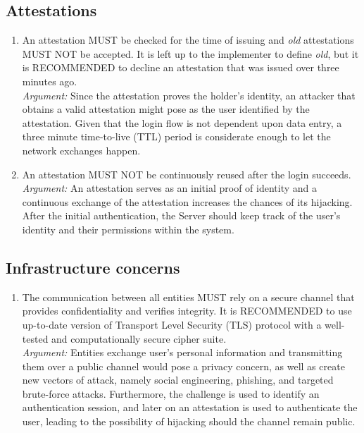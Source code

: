     \subsection{Attestations}
        \begin{enumerate}[resume]
            \item An attestation MUST be checked for the time of issuing and \textit{old} attestations MUST NOT be
                  accepted. It is left up to the implementer to define \textit{old}, but it is RECOMMENDED to
                  decline an attestation that was issued over three minutes ago.\\
            \textit{Argument:} Since the attestation proves the holder's identity, an attacker that obtains a valid
                               attestation might pose as the user identified by the attestation. Given that the login
                               flow is not dependent upon data entry, a three minute time-to-live (TTL) period is 
                               considerate enough to let the network exchanges happen.

            \item An attestation MUST NOT be continuously reused after the login succeeds.\\
            \textit{Argument:} An attestation serves as an initial proof of identity and a continuous exchange of the
                               attestation increases the chances of its hijacking. After the initial authentication, the
                               Server should keep track of the user's identity and their permissions within the system. 
        \end{enumerate}
    
    \subsection{Infrastructure concerns}
        \begin{enumerate}[resume]
            \item The communication between all entities MUST rely on a secure channel that provides confidentiality and 
                  verifies integrity. It is RECOMMENDED to use up-to-date version of Transport Level Security (TLS) protocol 
                  with a well-tested and computationally secure cipher suite.\\      
            \textit{Argument:} Entities exchange user's personal information and transmitting them over a 
                               public channel would pose a privacy concern, as well as create new vectors of attack, 
                               namely social engineering, phishing, and targeted brute-force attacks. Furthermore, 
                               the challenge is used to identify an authentication session, and later on an attestation 
                               is used to authenticate the user, leading to the possibility of hijacking should the channel
                               remain public.                 
        \end{enumerate}
